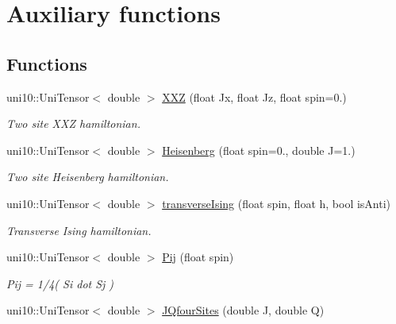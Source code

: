 \hypertarget{group__aux}{}\section{Auxiliary functions}
\label{group__aux}
\subsection*{Functions}
\begin{DoxyCompactItemize}
\item 
uni10\+::\+Uni\+Tensor$<$ double $>$ \hyperlink{group__aux_ga42668cf57e3df286e6d9775aff8e0549}{X\+XZ} (float Jx, float Jz, float spin=0.)\hypertarget{group__aux_ga42668cf57e3df286e6d9775aff8e0549}{}\label{group__aux_ga42668cf57e3df286e6d9775aff8e0549}

\begin{DoxyCompactList}\small\item\em Two site X\+XZ hamiltonian. \end{DoxyCompactList}\item 
uni10\+::\+Uni\+Tensor$<$ double $>$ \hyperlink{group__aux_gaa4dd61a79cd0e9da24162a51b09f990f}{Heisenberg} (float spin=0., double J=1.)\hypertarget{group__aux_gaa4dd61a79cd0e9da24162a51b09f990f}{}\label{group__aux_gaa4dd61a79cd0e9da24162a51b09f990f}

\begin{DoxyCompactList}\small\item\em Two site Heisenberg hamiltonian. \end{DoxyCompactList}\item 
uni10\+::\+Uni\+Tensor$<$ double $>$ \hyperlink{group__aux_ga531013bbaa93b9f9796fc77bf7f19153}{transverse\+Ising} (float spin, float h, bool is\+Anti)\hypertarget{group__aux_ga531013bbaa93b9f9796fc77bf7f19153}{}\label{group__aux_ga531013bbaa93b9f9796fc77bf7f19153}

\begin{DoxyCompactList}\small\item\em Transverse Ising hamiltonian. \end{DoxyCompactList}\item 
uni10\+::\+Uni\+Tensor$<$ double $>$ \hyperlink{group__aux_ga603111db160cf93a9a2d15ff0d6a9541}{Pij} (float spin)\hypertarget{group__aux_ga603111db160cf93a9a2d15ff0d6a9541}{}\label{group__aux_ga603111db160cf93a9a2d15ff0d6a9541}

\begin{DoxyCompactList}\small\item\em Pij = 1/4( Si dot Sj ) \end{DoxyCompactList}\item 
uni10\+::\+Uni\+Tensor$<$ double $>$ \hyperlink{group__aux_gadb0a1702f2b5455384ea168b74ae35d5}{J\+Qfour\+Sites} (double J, double Q)\hypertarget{group__aux_gadb0a1702f2b5455384ea168b74ae35d5}{}\label{group__aux_gadb0a1702f2b5455384ea168b74ae35d5}


\end{DoxyCompactItemize}

